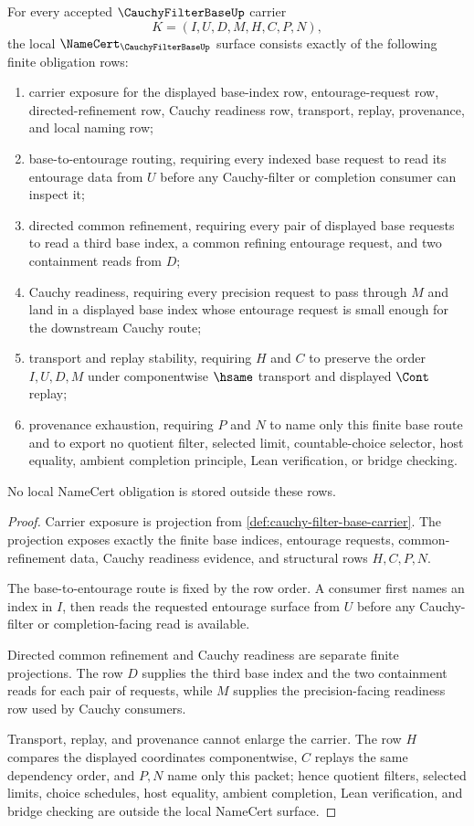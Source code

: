 \begin{theorem}
\label{thm:cauchy-filter-base-namecert-obligations}
For every accepted $\CauchyFilterBaseUp$ carrier
$$
K=(I,U,D,M,H,C,P,N),
$$
the local $\NameCert_{\CauchyFilterBaseUp}$ surface consists exactly of the following finite obligation rows:
\begin{enumerate}
\item carrier exposure for the displayed base-index row, entourage-request row, directed-refinement row, Cauchy readiness row, transport, replay, provenance, and local naming row;
\item base-to-entourage routing, requiring every indexed base request to read its entourage data from $U$ before any Cauchy-filter or completion consumer can inspect it;
\item directed common refinement, requiring every pair of displayed base requests to read a third base index, a common refining entourage request, and two containment reads from $D$;
\item Cauchy readiness, requiring every precision request to pass through $M$ and land in a displayed base index whose entourage request is small enough for the downstream Cauchy route;
\item transport and replay stability, requiring $H$ and $C$ to preserve the order $I,U,D,M$ under componentwise $\hsame$ transport and displayed $\Cont$ replay;
\item provenance exhaustion, requiring $P$ and $N$ to name only this finite base route and to export no quotient filter, selected limit, countable-choice selector, host equality, ambient completion principle, Lean verification, or bridge checking.
\end{enumerate}
No local NameCert obligation is stored outside these rows.
\end{theorem}
\begin{proof}
Carrier exposure is projection from \autoref{def:cauchy-filter-base-carrier}. The projection exposes exactly the finite base indices, entourage requests, common-refinement data, Cauchy readiness evidence, and structural rows $H,C,P,N$.

The base-to-entourage route is fixed by the row order. A consumer first names an index in $I$, then reads the requested entourage surface from $U$ before any Cauchy-filter or completion-facing read is available.

Directed common refinement and Cauchy readiness are separate finite projections. The row $D$ supplies the third base index and the two containment reads for each pair of requests, while $M$ supplies the precision-facing readiness row used by Cauchy consumers.

Transport, replay, and provenance cannot enlarge the carrier. The row $H$ compares the displayed coordinates componentwise, $C$ replays the same dependency order, and $P,N$ name only this packet; hence quotient filters, selected limits, choice schedules, host equality, ambient completion, Lean verification, and bridge checking are outside the local NameCert surface.
\end{proof}

